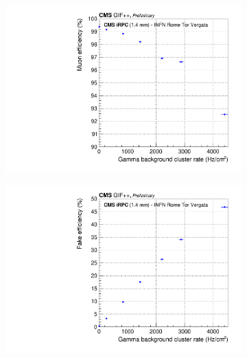 \begin{figure}[H]
\begin{subfigure}{.5\linewidth}
			\caption{\label{fig:iRPC_INFN_perf:B}}
		\end{subfigure}
		\begin{subfigure}{.5\linewidth}
		    \centering
			\includegraphics[width = \linewidth]{fig/chapt6/CMS-iRPC-INFN-MuonEfficiency_vs_Rate.pdf}
			\caption{\label{fig:iRPC_INFN_perf:C}}
		\end{subfigure}
		\begin{subfigure}{.5\linewidth}
		    \centering
			\includegraphics[width = \linewidth]{fig/chapt6/CMS-iRPC-INFN-FakeEfficiency_vs_Rate.pdf}
			\caption{\label{fig:iRPC_INFN_perf:D}}
		\end{subfigure}
		\caption{\label{fig:iRPC_INFN_perf} }
    \end{figure}
	 
